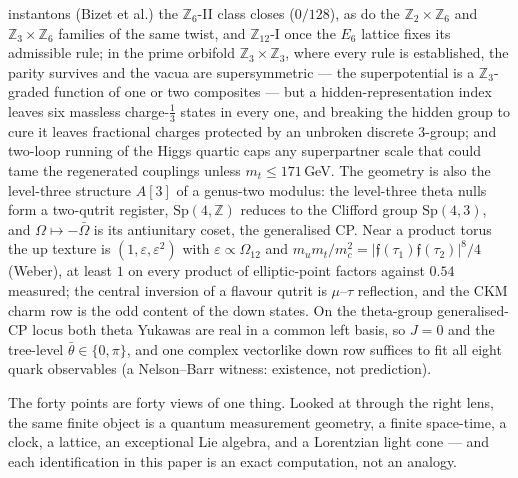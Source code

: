 \documentclass[11pt,twoside]{article}
\theoremstyle{plain}
\theoremstyle{definition}
\theoremstyle{remark}
\newcommand{\Z}{\mathbb{Z}}
\newcommand{\Sp}{\mathrm{Sp}}
\begin{document}
instantons (Bizet et al.) the $\Z_6$-II class closes ($0/128$), as do the $\Z_2\times\Z_6$ and $\Z_3\times\Z_6$
families of the same twist, and $\Z_{12}$-I once the $E_6$ lattice fixes its admissible rule; in the prime
orbifold $\Z_3\times\Z_3$, where every rule is established, the parity survives and the vacua are
supersymmetric --- the superpotential is a $\Z_3$-graded function of one or two composites --- but a
hidden-representation index leaves six massless charge-$\tfrac13$ states in every one, and breaking the hidden
group to cure it leaves fractional charges protected by an unbroken discrete $3$-group; and
two-loop running of the Higgs quartic caps any superpartner scale that could tame the regenerated
couplings unless $m_t\le171$\,GeV. The geometry is also the level-three structure $A[3]$ of a
genus-two modulus: the level-three theta nulls form a two-qutrit register, $\Sp(4,\Z)$ reduces to
the Clifford group $\Sp(4,3)$, and $\Omega\mapsto-\bar\Omega$ is its antiunitary coset, the
generalised CP. Near a product torus the up texture is $(1,\varepsilon,\varepsilon^2)$ with
$\varepsilon\propto\Omega_{12}$ and $m_um_t/m_c^2=|\mathfrak f(\tau_1)\mathfrak f(\tau_2)|^8/4$
(Weber), at least $1$ on every product of elliptic-point factors against $0.54$ measured; the central
inversion of a flavour qutrit is $\mu$--$\tau$ reflection, and the CKM charm row is the odd content
of the down states. On the theta-group generalised-CP locus both theta Yukawas are real in a common
left basis, so $J=0$ and the tree-level $\bar\theta\in\{0,\pi\}$, and one complex vectorlike down row
suffices to fit all eight quark observables (a Nelson--Barr witness: existence, not prediction).

\vspace{6mm}
\begin{keyidea}
The forty points are forty views of one thing. Looked at through the right lens, the
same finite object is a quantum measurement geometry, a finite space-time, a clock, a
lattice, an exceptional Lie algebra, and a Lorentzian light cone --- and each
identification in this paper is an exact computation, not an analogy.
\end{keyidea}

\clearpage
\tableofcontents
\clearpage













\appendix



\end{document}
